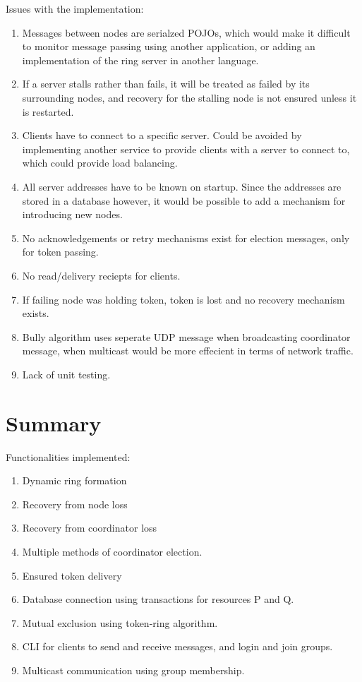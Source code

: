 \documentclass[12pt]{article}
\begin{document}
Issues with the implementation:
\begin{enumerate}
	\item Messages between nodes are serialzed POJOs, which would make it difficult to monitor message passing using another application, or adding an implementation of the ring server in another language.
	\item If a server stalls rather than fails, it will be treated as failed by its surrounding nodes, and recovery for the stalling node is not ensured unless it is restarted.
	\item Clients have to connect to a specific server. Could be avoided by implementing another service to provide clients with a server to connect to, which could provide load balancing.
	\item All server addresses have to be known on startup. Since the addresses are stored in a database however, it would be possible to add a mechanism for introducing new nodes.
	\item No acknowledgements or retry mechanisms exist for election messages, only for token passing.
	\item No read/delivery reciepts for clients.
	\item If failing node was holding token, token is lost and no recovery mechanism exists.
	\item Bully algorithm uses seperate UDP message when broadcasting coordinator message, when multicast would be more effecient in terms of network traffic. 
	\item Lack of unit testing.
\end{enumerate}

\section{Summary}

Functionalities implemented:
\begin{enumerate}
	\item Dynamic ring formation
	\item Recovery from node loss
	\item Recovery from coordinator loss
	\item Multiple methods of coordinator election.
	\item Ensured token delivery
	\item Database connection using transactions for resources P and Q.
	\item Mutual exclusion using token-ring algorithm.
	\item CLI for clients to send and receive messages, and login and join groups.
	\item Multicast communication using group membership.
\end{enumerate}
\end{document}
